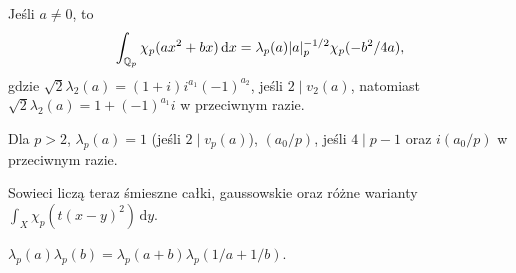 \begin{fakt}
	Jeśli $a \neq 0$, to
	\[
		\int_{\mathbb Q_p} \chi_p(ax^2 + bx)\,\textrm{d} x = \lambda_p(a) |a|_p^{-1/2} \chi_p(-b^2 / 4a),
	\]
	gdzie $\sqrt 2 \lambda_2(a) = (1+i) i^{a_1} (-1)^{a_2}$, jeśli $2 \mid v_2(a)$, natomiast $\sqrt{2} \lambda_2(a) = 1 + (-1)^{a_1} i$ w przeciwnym razie.

	Dla $p > 2$, $\lambda_p(a) = 1$ (jeśli $2 \mid v_p(a)$), $(a_0/p)$, jeśli $4 \mid p - 1$ oraz $i (a_0/p)$ w przeciwnym razie.
\end{fakt}

Sowieci liczą teraz śmieszne całki, gaussowskie oraz różne warianty $\int_X \chi_p (t(x-y)^2) \,\textrm{d}y$.

\begin{fakt}
	$\lambda_p(a) \lambda_p(b) = \lambda_p(a+b) \lambda_p(1/a+1/b)$.
\end{fakt}